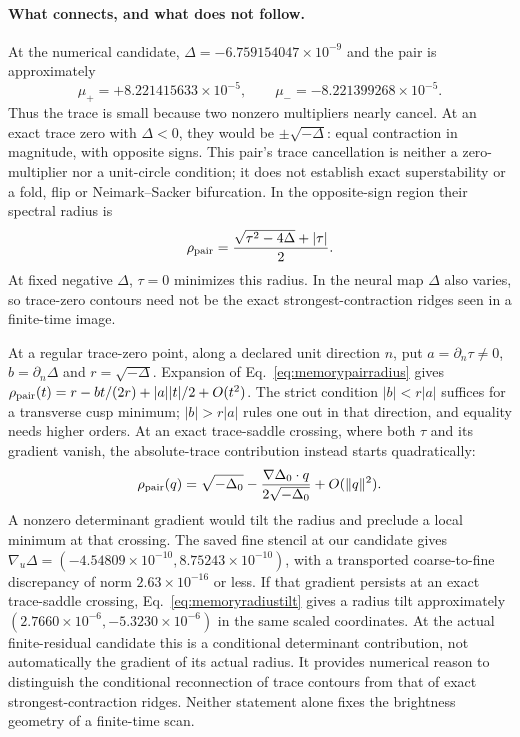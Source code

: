 \documentclass[11pt,letterpaper]{article}
\begin{document}
\paragraph{What connects, and what does not follow.} At the numerical candidate,
$\Delta=-6.759154047\times10^{-9}$ and the pair is approximately
\begin{equation}
 \mu_+=+8.221415633\times10^{-5},\qquad
 \mu_-=-8.221399268\times10^{-5}.
 \label{eq:memorymultipliers}
\end{equation}
Thus the trace is small because two nonzero multipliers nearly cancel. At an exact trace zero with $\Delta<0$,
they would be $\pm\sqrt{-\Delta}$: equal contraction in magnitude, with opposite signs. This pair's trace
cancellation is neither a zero-multiplier nor a unit-circle condition; it does not establish exact superstability
or a fold, flip or Neimark--Sacker bifurcation. In the opposite-sign region their spectral radius is
\begin{equation}
 \rho_{\rm pair}=\frac{\sqrt{\tau^2-4\Delta}+|\tau|}{2}.
 \label{eq:memorypairradius}
\end{equation}
At fixed negative $\Delta$, $\tau=0$ minimizes this radius. In the neural map $\Delta$ also varies, so
trace-zero contours need not be the exact strongest-contraction ridges seen in a finite-time image.

At a regular trace-zero point, along a declared unit direction $n$, put
$a=\partial_n\tau\ne0$, $b=\partial_n\Delta$ and $r=\sqrt{-\Delta}$. Expansion of
Eq.~\eqref{eq:memorypairradius} gives
$\rho_{\rm pair}(t)=r-bt/(2r)+|a||t|/2+O(t^2)$.
The strict condition $|b|<r|a|$ suffices for a transverse cusp minimum; $|b|>r|a|$ rules one out in that
direction, and equality needs higher orders. At an exact trace-saddle crossing, where both $\tau$ and its
gradient vanish, the absolute-trace contribution instead starts quadratically:
\begin{equation}
 \rho_{\rm pair}(q)=\sqrt{-\Delta_0}
 -\frac{\nabla\Delta_0\cdot q}{2\sqrt{-\Delta_0}}+O(\|q\|^2).
 \label{eq:memoryradiustilt}
\end{equation}
A nonzero determinant gradient would tilt the radius and preclude a local minimum at that crossing. The saved
fine stencil at our candidate gives
$\nabla_u\Delta=(-4.54809\times10^{-10},8.75243\times10^{-10})$, with a transported coarse-to-fine
discrepancy of norm $2.63\times10^{-16}$ or less. If that gradient persists at an exact trace-saddle crossing,
Eq.~\eqref{eq:memoryradiustilt} gives a radius tilt approximately
$(2.7660\times10^{-6},-5.3230\times10^{-6})$ in the same scaled coordinates. At the actual finite-residual
candidate this is a conditional determinant contribution, not automatically the gradient of its actual radius.
It provides numerical reason to distinguish the conditional reconnection of trace contours from that of exact
strongest-contraction ridges. Neither statement alone fixes the brightness geometry of a finite-time scan.
\end{document}
